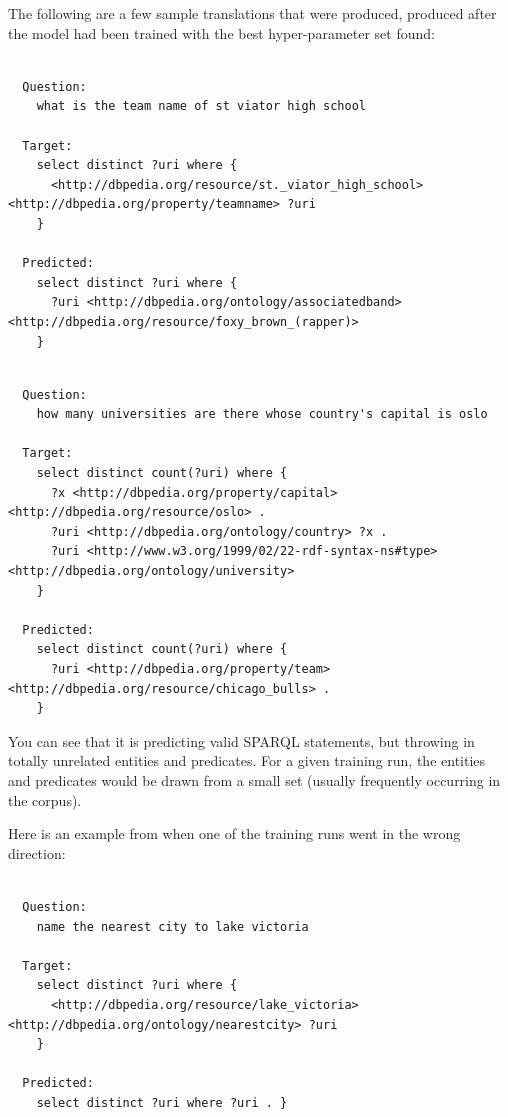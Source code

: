 \documentclass[12pt]{article}
\begin{document}
The following are a few sample translations that were produced, produced 
after the model had been trained with the best hyper-parameter set found:

\begin{lstlisting}[]

  Question: 
    what is the team name of st viator high school

  Target: 
    select distinct ?uri where {
      <http://dbpedia.org/resource/st._viator_high_school> <http://dbpedia.org/property/teamname> ?uri 
    }

  Predicted:
    select distinct ?uri where {
      ?uri <http://dbpedia.org/ontology/associatedband> <http://dbpedia.org/resource/foxy_brown_(rapper)>
    }

\end{lstlisting}

\begin{lstlisting}[]

  Question:
    how many universities are there whose country's capital is oslo

  Target:
    select distinct count(?uri) where {
      ?x <http://dbpedia.org/property/capital> <http://dbpedia.org/resource/oslo> .
      ?uri <http://dbpedia.org/ontology/country> ?x .
      ?uri <http://www.w3.org/1999/02/22-rdf-syntax-ns#type> <http://dbpedia.org/ontology/university>
    }

  Predicted:
    select distinct count(?uri) where {
      ?uri <http://dbpedia.org/property/team> <http://dbpedia.org/resource/chicago_bulls> . 
    }

\end{lstlisting}

You can see that it is predicting valid SPARQL statements, but throwing
in totally unrelated entities and predicates. For a given training run,
the entities and predicates would be drawn from a small set (usually 
frequently occurring in the corpus).

Here is an example from when one of the training runs went in the wrong direction:

\begin{lstlisting}[]

  Question:
    name the nearest city to lake victoria

  Target:
    select distinct ?uri where {
      <http://dbpedia.org/resource/lake_victoria> <http://dbpedia.org/ontology/nearestcity> ?uri
    }

  Predicted:
    select distinct ?uri where ?uri . }

\end{lstlisting}
\end{document}
